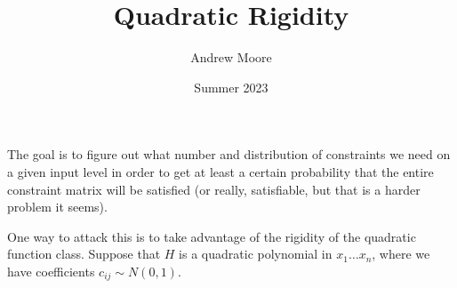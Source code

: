 \documentclass{article}
\title{Quadratic Rigidity}
\author{Andrew Moore}
\date{Summer 2023}
\begin{document}
\maketitle

The goal is to figure out what number and distribution of constraints we need on a given input level in order to get at least a certain probability that the entire constraint matrix will be satisfied (or really, satisfiable, but that is a harder problem it seems). 

One way to attack this is to take advantage of the rigidity of the quadratic function class. Suppose that $H$ is a quadratic polynomial in $x_1 \dots x_n$, where we have coefficients $c_{ij} \sim N(0,1)$. 
\end{document}
